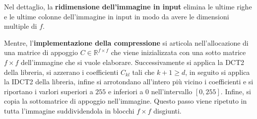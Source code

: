 Nel dettaglio, la \textbf{ridimensione dell'immagine in input} elimina le ultime
righe e le ultime colonne dell'immagine in input in modo da avere le dimensioni
multiple di $f$.

Mentre, l'\textbf{implementazione della compressione} si articola nell'allocazione
di una matrice di appoggio $C\in \mathbb{R}^{f\times f}$ che viene inizializzata
con una sotto matrice $f\times f$ dell'immagine che si vuole elaborare. Successivamente
si applica la DCT2 della libreria, si azzerano i coefficienti $C_{kl}$ tali che 
$k+1\ge d$, in seguito si applica la IDCT2 della libreria, infine si arrotondano 
all'intero più vicino i coefficienti e si riportano i varlori superiori a $255$ 
e inferiori a $0$ nell'intervallo $[0,255]$. Infine, si copia la sottomatrice di 
appoggio nell'immagine. Questo passo viene ripetuto in tutta l'immagine suddividendola 
in blocchi $f\times f$ disgiunti.